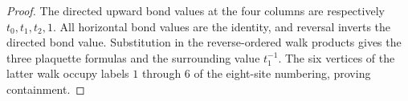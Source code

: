 \begin{proof}\leanok
    The directed upward bond values at the four columns are respectively
    $t_0,t_1,t_2,1$. All horizontal bond values are the identity, and reversal
    inverts the directed bond value. Substitution in the reverse-ordered
    walk products gives the three plaquette formulas and the surrounding
    value $t_1^{-1}$. The six vertices of the latter walk occupy labels
    $1$ through $6$ of the eight-site numbering, proving containment.
\end{proof}
